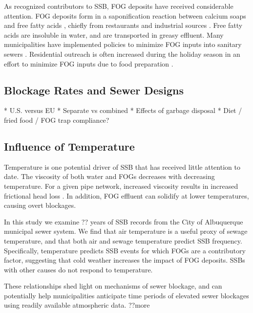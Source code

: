 \documentclass[letterpaper,12pt]{article}
\begin{document}
As recognized contributors to SSB, FOG deposits have received considerable
attention. FOG deposits form in a saponification reaction between calcium soaps
and free fatty acids \cite{He2011}, chiefly from restaurants and
industrial sources \cite{Keener2008}.  Free fatty acids are insoluble in
water, and are transported in greasy effluent.  Many municipalities have
implemented policies to minimize FOG inputs into sanitary sewers
\cite{hassey2001grease, heckler2003best, parnell2005innovative,
bennett2006atlanta, tupper2008fog}.  Residential outreach is often increased
during the holiday season in an effort to minimize FOG inputs due to food
preparation \cite{tupper2008fog}.

\subsection*{Blockage Rates and Sewer Designs}
* U.S. versus EU
* Separate vs combined
* Effects of garbage disposal
* Diet / fried food / FOG trap compliance?

\subsection*{Influence of Temperature}
Temperature is one potential driver of SSB that has received little attention to
date. The viscosity of both water and FOGs decreases with decreasing
temperature. For a given pipe network, increased viscosity results in increased
frictional head loss \cite{romeo2002improved}. In addition, FOG effluent
can solidify at lower temperatures, causing overt blockages.

In this study we examine ?? years of SSB records from the City of Albuquerque
municipal sewer system.  We find that air temperature is
a useful proxy of sewage temperature, and that both air and sewage temperature
predict SSB frequency. Specifically, temperature predicts SSB events for which
FOGs are a contributory factor, suggesting that cold weather increases the impact of FOG deposits. SSBs with other causes do not respond to temperature. 

These relationships shed light on mechanisms
of sewer blockage, and can potentially help municipalities anticipate time
periods of elevated sewer blockages using readily available atmospheric data.
??more



\end{document}
